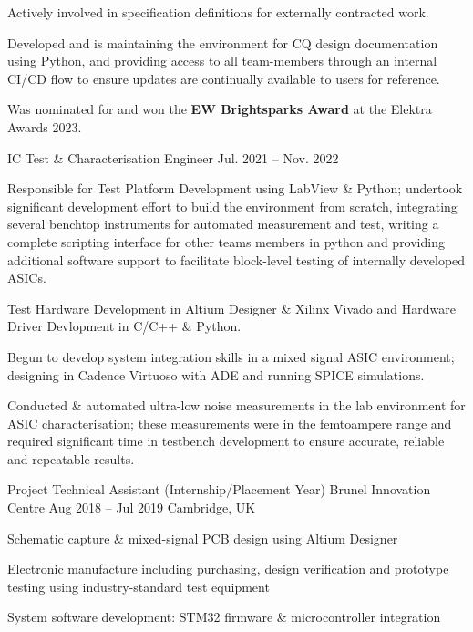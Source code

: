 \begin{cventries}
{\begin{cvitems}
          \item {Actively involved in specification definitions for externally contracted work.}
          \item {Developed and is maintaining the environment for CQ design documentation using Python, and providing access to all team-members through an internal CI/CD flow to ensure updates are continually available to users for reference.}
          \item {Was nominated for and won the \textbf{EW Brightsparks Award} at the Elektra Awards 2023.}
        \end{cvitems}
      }

    \cventry
      {IC Test \& Characterisation Engineer} %
      {} %
      {Jul. 2021 -- Nov. 2022} %
      {} %
      {
        \begin{cvitems}
          \item{Responsible for Test Platform Development using LabView \& Python; undertook significant development effort to build the environment from scratch, integrating several benchtop instruments for automated measurement and test, writing a complete scripting interface for other teams members in python and providing additional software support to facilitate block-level testing of internally developed ASICs.}
          \item{Test Hardware Development in Altium Designer \& Xilinx Vivado and Hardware Driver Devlopment in C/C++ \& Python.}
          \item{Begun to develop system integration skills in a mixed signal ASIC environment; designing in Cadence Virtuoso with ADE and running SPICE simulations.}
          \item{Conducted \& automated ultra-low noise measurements in the lab environment for ASIC characterisation; these measurements were in the femtoampere range and required significant time in testbench development to ensure accurate, reliable and repeatable results.}
        \end{cvitems}
      }

    \cventry
      {Project Technical Assistant (Internship/Placement Year)}
      {Brunel Innovation Centre}
      {Aug 2018 -- Jul 2019}
      {Cambridge, UK}
      {
        \begin{cvitems}
          \item Schematic capture \& mixed-signal PCB design using Altium Designer
          \item Electronic manufacture including purchasing, design verification and prototype testing using industry-standard test equipment
          \item System software development: STM32 firmware \& microcontroller integration
        \end{cvitems}
      }


\end{cventries}
